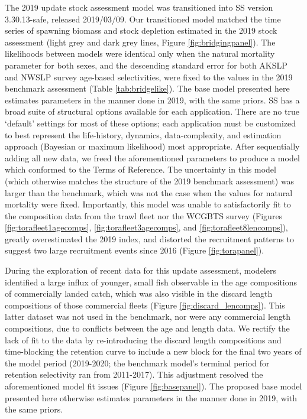 \documentclass[11pt,
  english,
  a4paper,
]{article}
\begin{document}
The 2019 update stock assessment model was transitioned into SS version 3.30.13-safe, released 2019/03/09. Our transitioned model matched the time series of spawning biomass and stock depletion estimated in the 2019 stock assessment (light grey and dark grey lines, Figure \ref{fig:bridgingpanel}). The likelihoods between models were identical only when the natural mortality parameter for both sexes, and the descending standard error for both AKSLP and NWSLP survey age-based selectivities, were fixed to the values in the 2019 benchmark assessment (Table \ref{tab:bridgelike}). The base model presented here estimates parameters in the manner done in 2019, with the same priors. SS has a broad suite of structural options available for each application. There are no true `default' settings for most of these options; each application must be customized to best represent the life-history, dynamics, data-complexity, and estimation approach (Bayesian or maximum likelihood) most appropriate. After sequentially adding all new data, we freed the aforementioned parameters to produce a model which conformed to the Terms of Reference. The uncertainty in this model (which otherwise matches the structure of the 2019 benchmark assessment) was larger than the benchmark, which was not the case when the values for natural mortality were fixed. Importantly, this model was unable to satisfactorily fit to the composition data from the trawl fleet nor the WCGBTS survey (Figures \ref{fig:torafleet1agecomps}, \ref{fig:torafleet3agecomps}, and \ref{fig:torafleet8lencomps}), greatly overestimated the 2019 index, and distorted the recruitment patterns to suggest two large recruitment events since 2016 (Figure \ref{fig:torapanel}).

\leavevmode\tagmcend\tagstructend\par


During the exploration of recent data for this update assessment, modelers identified a large influx of younger, small fish observable in the age compositions of commercially landed catch, which was also visible in the discard length compositions of those commercial fleets (Figure \ref{fig:discard_lencomps}). This latter dataset was not used in the benchmark, nor were any commercial length compositions, due to conflicts between the age and length data. We rectify the lack of fit to the data by re-introducing the discard length compositions and time-blocking the retention curve to include a new block for the final two years of the model period (2019-2020; the benchmark model's terminal period for retention selectivity ran from 2011-2017). This adjustment resolved the aforementioned model fit issues (Figure \ref{fig:basepanel}). The proposed base model presented here otherwise estimates parameters in the manner done in 2019, with the same priors.
\end{document}
